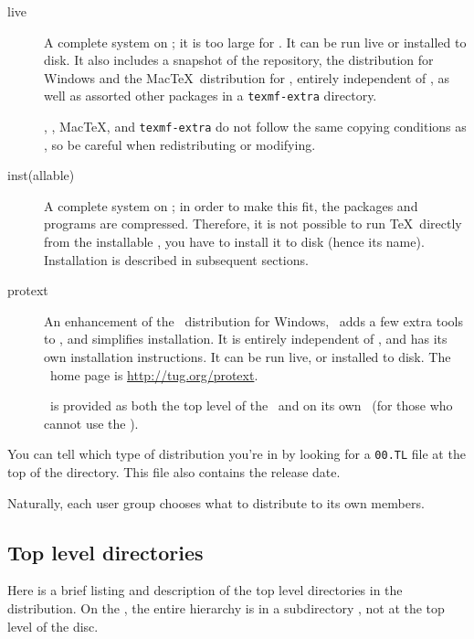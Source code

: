 \documentclass{article}
\begin{document}
\begin{description}

\item [live] A complete system on ; it is too large
for .  It can be run live or installed to disk.  It also
includes a snapshot of the \CTAN{} repository, the  
distribution for Windows and the Mac\TeX\ distribution for \MacOSX, entirely 
independent of \TL{}, as well as assorted other packages in a 
\texttt{texmf-extra} directory.

\CTAN{}, , Mac\TeX, and \texttt{texmf-extra} do not follow
the same copying conditions as \TL{}, so be careful when redistributing or
modifying.

\item [inst(allable)] A complete system on \CD; in order to make this fit,
the packages and programs are compressed.  Therefore, it is not possible
to run \TeX\ directly from the installable \CD, you have to install it
to disk (hence its name). Installation is described in subsequent sections.
   
\item [protext] An enhancement of the \MIKTEX\ distribution for Windows,
\ProTeXt\ adds a few extra tools to \MIKTEX, and simplifies
installation.  It is entirely independent of \TL{}, and has its own
installation instructions.  It can be run live, or installed to disk.
The \ProTeXt\ home page is \url{http://tug.org/protext}.

\ProTeXt\ is provided as both the top level of the  \DVD\
and on its own \CD\ (for those who cannot use the \DVD).

\end{description}

\noindent You can tell which type of distribution you're in by looking
for a \texttt{00\var{type}.TL} file at the top of the \TL{} directory.
This file also contains the \TL{} release date.

Naturally, each user group chooses what to distribute to its own members.


\subsection{Top level directories}
\label{sec:tld}

Here is a brief listing and description of the top level directories in
the \TL{} distribution.  On the \pkgname{live} \DVD, the entire \TL{}
hierarchy is in a subdirectory \dirname{texliveYYYY}, not at the top
level of the disc.
\end{document}
